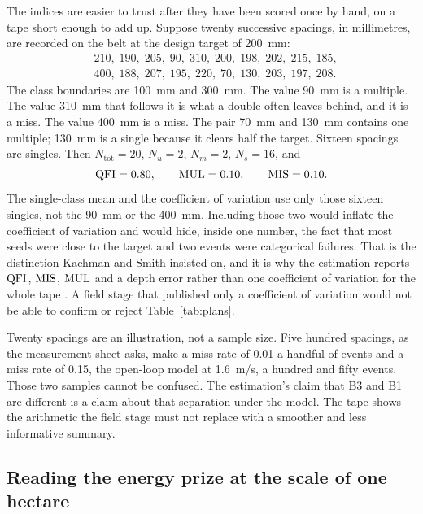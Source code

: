 The indices are easier to trust after they have been scored once by hand, on a tape short enough to add up. Suppose twenty successive spacings, in millimetres, are recorded on the belt at the design target of \SI{200}{mm}:
\begin{equation*}
\begin{aligned}
&210,\; 190,\; 205,\; 90,\; 310,\; 200,\; 198,\; 202,\; 215,\; 185,\\
&400,\; 188,\; 207,\; 195,\; 220,\; 70,\; 130,\; 203,\; 197,\; 208.
\end{aligned}
\end{equation*}
The class boundaries are \SI{100}{mm} and \SI{300}{mm}. The value \SI{90}{mm} is a multiple. The value \SI{310}{mm} that follows it is what a double often leaves behind, and it is a miss. The value \SI{400}{mm} is a miss. The pair \SI{70}{mm} and \SI{130}{mm} contains one multiple; \SI{130}{mm} is a single because it clears half the target. Sixteen spacings are singles. Then \(N_{\mathrm{tot}}=20\), \(N_u=2\), \(N_m=2\), \(N_s=16\), and
\begin{equation}
\label{eq:hand}
\mathrm{QFI} = 0.80,\qquad \mathrm{MUL} = 0.10,\qquad \mathrm{MIS} = 0.10.
\end{equation}
The single-class mean and the coefficient of variation use only those sixteen singles, not the \SI{90}{mm} or the \SI{400}{mm}. Including those two would inflate the coefficient of variation and would hide, inside one number, the fact that most seeds were close to the target and two events were categorical failures. That is the distinction Kachman and Smith insisted on, and it is why the estimation reports \(\mathrm{QFI}\), \(\mathrm{MIS}\), \(\mathrm{MUL}\) and a depth error rather than one coefficient of variation for the whole tape \cite{kachman1995}. A field stage that published only a coefficient of variation would not be able to confirm or reject Table~\ref{tab:plans}.

Twenty spacings are an illustration, not a sample size. Five hundred spacings, as the measurement sheet asks, make a miss rate of \num{0.01} a handful of events and a miss rate of \num{0.15}, the open-loop model at \SI{1.6}{m/s}, a hundred and fifty events. Those two samples cannot be confused. The estimation's claim that B3 and B1 are different is a claim about that separation under the model. The tape shows the arithmetic the field stage must not replace with a smoother and less informative summary.

\subsection{Reading the energy prize at the scale of one hectare}

